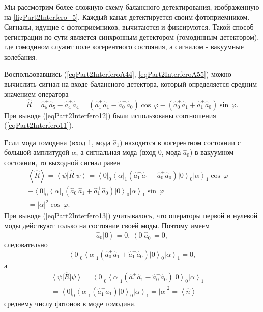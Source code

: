 

Мы рассмотрим более сложную схему балансного детектирования,
изображенную на \autoref{figPart2Interfero_5}. Каждый канал
детектируется своим фотоприемником. Сигналы, идущие с фотоприемников, 
вычитаются и фиксируются. Такой способ регистрации по сути является
синхронным детектором (гомодинным детектором), где гомодином служит
поле когерентного состояния, а сигналом - вакуумные колебания.

Воспользовавшись (\ref{eqPart2InterferoA44},
\ref{eqPart2InterferoA55}) можно вычислить
сигнал на входе балансного детектора, который определяется средним значением
оператора  
\begin{equation}
\hat{R} = 
\hat{a}_5^{+} \hat{a}_5 - 
\hat{a}_4^{+} \hat{a}_4 =
\left(
\hat{a}_1^{+} \hat{a}_1 - 
\hat{a}_0^{+} \hat{a}_0
\right) \cos\,\varphi -
\left(
\hat{a}_0^{+} \hat{a}_1 + 
\hat{a}_1^{+} \hat{a}_0
\right) \sin\,\varphi.
\label{eqPart2Interfero12}
\end{equation}
При выводе (\ref{eqPart2Interfero12}) были использованы соотношения
(\ref{eqPart2Interfero11}).

Если мода гомодина (вход 1, мода $\hat{a}_1$) находится в
когерентном состоянии с большой амплитудой $\alpha$, а сигнальная мода
(вход 0, мода $\hat{a}_0$) в вакуумном состоянии, то выходной сигнал
равен
\begin{eqnarray}
\left<\hat{R}\right> = 
\left<\psi\right|\hat{R} \left|\psi\right> = 
\left<0\right|_0\left<\alpha\right|_1
\left(
\hat{a}_1^{+} \hat{a}_1 - 
\hat{a}_0^{+} \hat{a}_0
\right)
\left|0\right>_0\left|\alpha\right>_1
\cos\,\varphi
-
\nonumber \\
-
\left<0\right|_0\left<\alpha\right|_1
\left(
\hat{a}_0^{+} \hat{a}_1 + 
\hat{a}_1^{+} \hat{a}_0
\right) 
\left|0\right>_0\left|\alpha\right>_1
\sin\,\varphi = 
\nonumber \\
= \left|\alpha\right|^2 \cos\,\varphi.
\label{eqPart2Interfero13}
\end{eqnarray}
При выводе (\ref{eqPart2Interfero13}) учитывалось, что операторы
первой и нулевой моды действуют только на состояние своей
моды. Поэтому имеем
\[
\hat{a}_0\left|0\right> = 0, \, 
\left<0\right|\hat{a}_0^{+} = 0,
\]
следовательно 
\[
\left<0\right|_0\left<\alpha\right|_1
\left(
\hat{a}_0^{+} \hat{a}_1 + 
\hat{a}_1^{+} \hat{a}_0
\right) 
\left|0\right>_0\left|\alpha\right>_1 = 0,
\]
а
\begin{eqnarray}
\left<\psi\right|\hat{R} \left|\psi\right>= 
\left<0\right|_0\left<\alpha\right|_1
\left(
\hat{a}_1^{+} \hat{a}_1 - 
\hat{a}_0^{+} \hat{a}_0
\right)
\left|0\right>_0\left|\alpha\right>_1
=
\nonumber \\
=
\left<0\right|_0\left<\alpha\right|_1
\left(
\hat{a}_1^{+} \hat{a}_1
\right)
\left|0\right>_0\left|\alpha\right>_1
= \left|\alpha\right|^2 = 
\left<\hat{n}\right>
\nonumber
\end{eqnarray}
среднему числу фотонов в моде гомодина.

